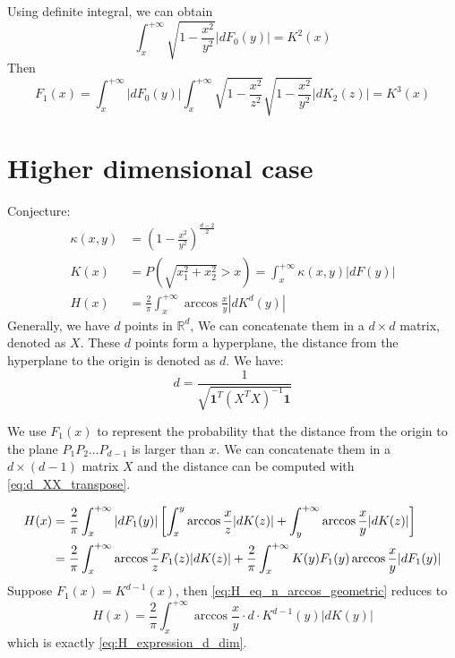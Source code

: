 \documentclass{article}
\begin{document}
Using definite integral, we can obtain
\begin{equation}
    \int_x^{+\infty} \sqrt{1-\frac{x^2}{y^2}}
    |dF_0(y)| = K^2(x)
\end{equation}
Then
\begin{equation}
    F_1(x) = \int_x^{+\infty} |dF_0(y)|
    \int_x^{+\infty} \sqrt{1-\frac{x^2}{z^2}}
    \sqrt{1-\frac{x^2}{y^2}} |dK_2(z)|
    = K^3(x)
\end{equation}

\section{Higher dimensional case}
Conjecture:
\begin{align}
    \kappa(x,y) & =(1-\frac{x^2}{y^2})^{\frac{d-2}{2}}\\
    K(x) &=P(\sqrt{x_1^2+x_2^2}>x)= \int_x^{+\infty} \kappa(x,y)|dF(y)| \\
    H(x) &= \frac{2}{\pi}
    \int_x^{+\infty} \arccos\frac{x}{y}
    |d K^d(y)|\label{eq:H_expression_d_dim}
\end{align}
Generally, we have $d$ points in $\mathbb{R}^d$, We
can concatenate them
in a $d\times d$ matrix, denoted as $X$.
These $d$ points form a hyperplane,
the distance from the hyperplane to the origin is denoted as $d$.
We have:
\begin{equation}\label{eq:d_XX_transpose}
    d = \frac{1}{\sqrt{\mathbf{1}^T (X^T X)^{-1} \mathbf{1}}}
\end{equation}

We use $F_1(x)$ to represent the probability that
the distance from the origin to the plane $P_1P_2\dots P_{d-1}$
is larger than $x$. We can concatenate them in a $d \times (d-1)$ matrix $X$
and the distance can be computed with \eqref{eq:d_XX_transpose}.

\begin{align}\label{eq:H_eq_n_arccos_geometric}
    H(x) &= \frac{2}{\pi}\int_x^{+\infty}|dF_1(y)|
    \left[ \int_x^y \arccos\frac{x}{z}|dK(z)|
    +\int_y^{+\infty}\arccos\frac{x}{y} |dK(z)|\right]\\
    &=\frac{2}{\pi}\int_x^{+\infty} \arccos\frac{x}{z}
    F_1(z)|dK(z)|+\frac{2}{\pi}\int_{x}^{+\infty} K(y)F_1(y)\arccos\frac{x}{y}|dF_1(y)| \notag 
\end{align}
Suppose $F_1(x)=K^{d-1}(x)$,
then \eqref{eq:H_eq_n_arccos_geometric} reduces to
$$
H(x) = \frac{2}{\pi}\int_x^{+\infty}  \arccos\frac{x}{y}\cdot
d\cdot  K^{d-1}(y) |dK(y)|
$$
which is exactly \eqref{eq:H_expression_d_dim}.
\end{document}
